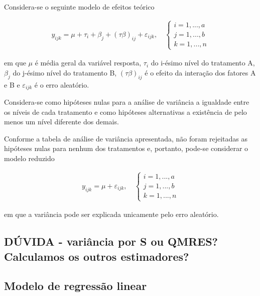 \documentclass[
]{article}
\begin{document}
Considera-se o seguinte modelo de efeitos teórico

\begin{align}
  y_{ijk} = \mu + \tau_i + \beta_j + (\tau\beta)_{ij} + \varepsilon_{ijk}, \quad
  \begin{cases}
    i = 1, ..., a\\
    j = 1, ..., b\\
    k = 1, ..., n
  \end{cases}
\end{align}

em que \(\mu\) é média geral da variável resposta, \(\tau_i\) do i-ésimo
nível do tratamento A, \(\beta_j\) do j-ésimo nível do tratamento B,
\((\tau\beta)_{ij}\) é o efeito da interação dos fatores A e B e
\(\varepsilon_{ijk}\) é o erro aleatório.

Considera-se como hipóteses nulas para a análise de variância a
igualdade entre os níveis de cada tratamento e como hipóteses
alternativas a existência de pelo menos um nível diferente dos demais.

Conforme a tabela de análise de variância apresentada, não foram
rejeitadas as hipóteses nulas para nenhum dos tratamentos e, portanto,
pode-se considerar o modelo reduzido

\begin{align}
  y_{ijk} = \mu + \varepsilon_{ijk}, \quad
  \begin{cases}
    i = 1, ..., a\\
    j = 1, ..., b\\
    k = 1, ..., n
  \end{cases}
\end{align}

em que a variância pode ser explicada unicamente pelo erro aleatório.

\hypertarget{duxfavida---variuxe2ncia-por-s-ou-qmres-calculamos-os-outros-estimadores}{%
\subsection{DÚVIDA - variância por S ou QMRES? Calculamos os outros
estimadores?}\label{duxfavida---variuxe2ncia-por-s-ou-qmres-calculamos-os-outros-estimadores}}

\hypertarget{modelo-de-regressuxe3o-linear}{%
\subsection{Modelo de regressão
linear}\label{modelo-de-regressuxe3o-linear}}
\end{document}
